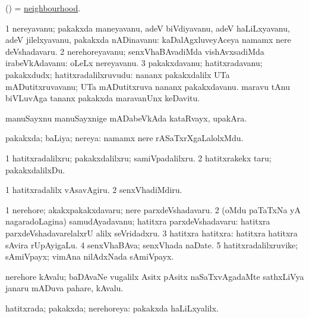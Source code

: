 \bentry
{}
\gl{\nA}
\bmng
(\ame) = \hyperlink{neighbourhood}{neighbourhood}. 
\emng
\eentry

\bentry
{}
\gl{\nA}
\bmng
\bnum
\num{1} nereyavanu; pakakxda maneyavanu, adeV biVdiyavanu, adeV haLiLxyavanu, adeV jilelxyavanu, pakakxda nADinavanu:  kaDalAgxluveyAceya namamx nere deVshadavaru. 
\num{2} nerehoreyavanu; senxVhaBAvadiMda vishAvxsadiMda irabeVkAdavanu:  oLeLx nereyavanu. 
\num{3} pakakxdavanu; hatitxradavanu; pakakxdudx; hatitxradalilxruvudu:  nananx pakakxdalilx UTa mADutitxruvavanu; UTa mADutitxruva nananx pakakxdavanu.  maravu tAnu biVLuvAga tananx pakakxda maravanUnx keDavitu. 
\enum
\emng

\noindent
\gl{\pagu}
\bmng
{} manuSayxnu manuSayxnige mADabeVkAda kataRvayx, upakAra. 
\emng
\eentry

\bentry
{}
\gl{\gu}
\bmng
pakakxda; baLiya; nereya:  namamx nere rASaTxrXgaLalolxMdu. 
\emng
\eentry

\bentry
{}
\gl{\sakirx}
\bmng
\bnum
\num{1} hatitxradalilxru; pakakxdalilxru; samiVpadalilxru. 
\num{2} hatitxrakekx taru; pakakxdalilxDu. 
\enum
\emng

\noindent
\gl{\akirx}
\bmng
\bnum
\num{1} hatitxradalilx vAsavAgiru. 
\num{2} senxVhadiMdiru. 
\enum
\emng
\eentry

\bentry
{}
\gl{\nA}
\bmng
\bnum
\num{1} nerehore; akakxpakakxdavaru; nere parxdeVshadavaru. 
\num{2} (oMdu paTaTxNa yA nagaradoLagina) samudAyadavanu; hatitxra parxdeVshadavaru:  hatitxra parxdeVshadavarelalxrU alilx seVridadxru. 
\num{3} hatitxra hatitxra:  hatitxra hatitxra sAvira rUpAyigaLu. 
\num{4} senxVhaBAva; senxVhada naDate. 
\num{5} hatitxradalilxruvike; sAmiVpayx;  vimAna nilAdxNada sAmiVpayx. 
\enum
\emng
\eentry

\bentry
{}
\gl{\nA}
\bmng
nerehore kAvalu; baDAvaNe \mo vugalilx Asitx pAsitx naSaTxvAgadaMte sathxLiVya janaru mADuva pahare, kAvalu. 
\emng
\eentry

\bentry
{}
\gl{\gu}
\bmng
hatitxrada; pakakxda; nerehoreya:  pakakxda haLiLxyalilx. 
\emng
\eentry

